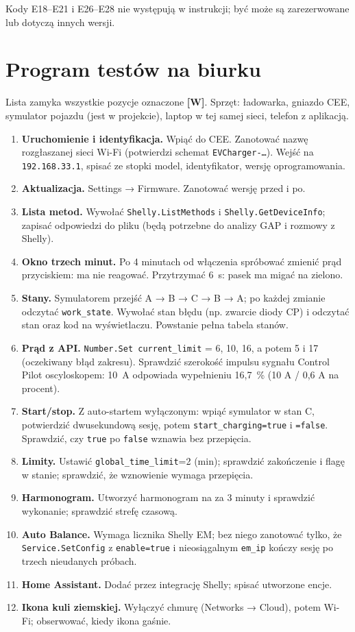 \documentclass[11pt,a4paper]{article}
\newcommand{\tagW}{\textcolor{apamber}{\textbf{[W]}}}
\newcommand{\code}[1]{\texttt{#1}}
\begin{document}
Kody E18–E21 i E26–E28 nie występują w instrukcji; być może są zarezerwowane lub dotyczą innych wersji.

\section{Program testów na biurku}
\label{sec:testy}

Lista zamyka wszystkie pozycje oznaczone \tagW. Sprzęt: ładowarka, gniazdo CEE, symulator pojazdu (jest w projekcie), laptop w tej samej sieci, telefon z aplikacją.

\begin{enumerate}[label=\arabic*.]
\item \textbf{Uruchomienie i identyfikacja.} Wpiąć do CEE. Zanotować nazwę rozgłaszanej sieci Wi-Fi (potwierdzi schemat \code{EVCharger-…}). Wejść na \code{192.168.33.1}, spisać ze stopki model, identyfikator, wersję oprogramowania.
\item \textbf{Aktualizacja.} Settings → Firmware. Zanotować wersję przed i po.
\item \textbf{Lista metod.} Wywołać \code{Shelly.ListMethods} i \code{Shelly.GetDeviceInfo}; zapisać odpowiedzi do pliku (będą potrzebne do analizy GAP i rozmowy z Shelly).
\item \textbf{Okno trzech minut.} Po 4 minutach od włączenia spróbować zmienić prąd przyciskiem: ma nie reagować. Przytrzymać 6~s: pasek ma migać na zielono.
\item \textbf{Stany.} Symulatorem przejść A → B → C → B → A; po każdej zmianie odczytać \code{work\_state}. Wywołać stan błędu (np. zwarcie diody CP) i odczytać stan oraz kod na wyświetlaczu. Powstanie pełna tabela stanów.
\item \textbf{Prąd z API.} \code{Number.Set current\_limit} = 6, 10, 16, a potem 5 i 17 (oczekiwany błąd zakresu). Sprawdzić szerokość impulsu sygnału Control Pilot oscyloskopem: 10~A odpowiada wypełnieniu 16,7~\% (10 A / 0,6 A na procent).
\item \textbf{Start/stop.} Z auto-startem wyłączonym: wpiąć symulator w stan C, potwierdzić dwusekundową sesję, potem \code{start\_charging=true} i \code{=false}. Sprawdzić, czy \code{true} po \code{false} wznawia bez przepięcia.
\item \textbf{Limity.} Ustawić \code{global\_time\_limit}=2 (min); sprawdzić zakończenie i flagę w stanie; sprawdzić, że wznowienie wymaga przepięcia.
\item \textbf{Harmonogram.} Utworzyć harmonogram na za 3 minuty i sprawdzić wykonanie; sprawdzić strefę czasową.
\item \textbf{Auto Balance.} Wymaga licznika Shelly EM; bez niego zanotować tylko, że \code{Service.SetConfig} z \code{enable=true} i nieosiągalnym \code{em\_ip} kończy sesję po trzech nieudanych próbach.
\item \textbf{Home Assistant.} Dodać przez integrację Shelly; spisać utworzone encje.
\item \textbf{Ikona kuli ziemskiej.} Wyłączyć chmurę (Networks → Cloud), potem Wi-Fi; obserwować, kiedy ikona gaśnie.
\end{enumerate}
\end{document}
